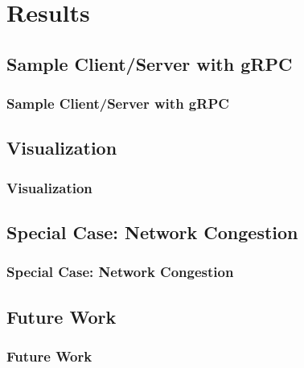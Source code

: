 \documentclass[10pt]{beamer}
\begin{document}

\section{Results}


\subsection{Sample Client/Server with gRPC}
\begin{frame}
\frametitle{Sample Client/Server with gRPC}
\end{frame}

\subsection{Visualization}
\begin{frame}
\frametitle{Visualization}
\end{frame}

\subsection{Special Case: Network Congestion}
\begin{frame}
\frametitle{Special Case: Network Congestion}
\end{frame}

\subsection{Future Work}
\begin{frame}
\frametitle{Future Work}
\end{frame}


%
%
%
\end{document}

